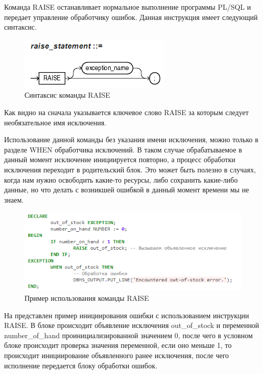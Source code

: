 Команда RAISE останавливает нормальное выполнение программы PL/SQL и передает управление обработчику ошибок. Данная инструкция имеет следующий синтаксис.

\begin{figure}[ht!] 
	\center
	\includegraphics [scale=1] {my_folder/img/C1_raise_syntax}
	\caption{Синтаксис команды RAISE} 
	\label{fig:C1_raise_syntax}  
\end{figure}
\FloatBarrier

Как видно на  сначала указывается ключевое слово RAISE за которым следует необязательное имя исключения. 

Использование данной команды без указания имени исключения, можно только в разделе WHEN обработчика исключений. В таком случае обрабатываемое в данный момент исключение инициируется повторно, а процесс обработки исключения переходит в родительский блок. Это может быть полезно в случаях, когда нам нужно освободить какие-то ресурсы, либо сохранить какие-либо данные, но что делать с возникшей ошибкой в данный момент времени мы не знаем.

\begin{figure}[ht!] 
	\center
	\includegraphics [scale=1] {my_folder/img/C1_raise_example}
	\caption{Пример использования команды RAISE} 
	\label{fig:C1_raise_example}  
\end{figure}
\FloatBarrier

На  представлен пример инициирования ошибки с использованием инструкции RAISE. В блоке происходит объявление исключения out\_of\_stock и переменной number\_of\_hand проинициализированной значением 0, после чего в условном блоке происходит проверка значения переменной, если оно меньше 1, то происходит инициирование объявленного ранее исключения, после чего исполнение передается блоку обработки ошибок. 

